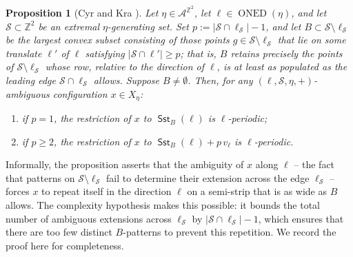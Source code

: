 \documentclass[12pt]{amsart}
\numberwithin{equation}{section}
\newtheorem{proposition}[theorem]{Proposition}
\DeclareMathOperator{\nexpd}{ONED}
\DeclareMathOperator{\sst}{\mathsf{Sst}}
\newcommand{\bb}[1]{\mathbb{#1}}
\begin{document}
\begin{proposition}[Cyr and Kra \cite{CyrKra15}]\label{prop_CyrKra}
Let $\eta \in \mathcal{A}^{\bb{Z}^2}$, let $\pmb{\ell} \in \nexpd(\eta)$,
and let $\mathcal{S} \subset \bb{Z}^2$ be an extremal $\eta$-generating
set. Set $p := |\mathcal{S} \cap \pmb{\ell}_{\mathcal{S}}|-1$, and let
$B \subset \mathcal{S} \setminus \pmb{\ell}_{\mathcal{S}}$ be the largest
convex subset consisting of those points $g \in \mathcal{S} \setminus
\pmb{\ell}_{\mathcal{S}}$ that lie on some translate $\pmb{\ell}'$ of
$\pmb{\ell}$ satisfying $|\mathcal{S} \cap \pmb{\ell}'| \geq p$; that
is, $B$ retains precisely the points of $\mathcal{S} \setminus
\pmb{\ell}_{\mathcal{S}}$ whose row, relative to the direction of
$\pmb{\ell}$, is at least as populated as the leading edge $\mathcal{S} \cap \pmb{\ell}_{\mathcal{S}}$
allows. Suppose $B \neq \emptyset$. Then, for any $(\pmb{\ell},\mathcal{S},
\eta,+)$-ambiguous configuration $x \in X_\eta$:
\begin{enumerate}[label=(\roman*)]\setlength{\itemsep}{5pt}
    \item if $p = 1$, the restriction of $x$ to $\sst_{B}(\pmb{\ell})$
    is $\ell$-periodic;
    \item if $p \geq 2$, the restriction of $x$ to
    $\sst_{B}(\pmb{\ell}) + p\,v_{\pmb{\ell}}$ is $\ell$-periodic.
\end{enumerate}
\end{proposition}

Informally, the proposition asserts that the ambiguity of $x$ along $\pmb{\ell}$ -- the fact that patterns on $\mathcal S \setminus \pmb{\ell}_{\mathcal S}$ fail to determine their extension across the edge $ \pmb{\ell}_{\mathcal S} $ -- forces $ x $ to repeat itself in the direction $ \pmb{\ell} $ on a semi-strip that is as wide as $B$ allows. The complexity hypothesis makes this possible: it bounds the total number of ambiguous extensions across $\pmb{\ell}_{\mathcal S}$ by $|\mathcal S \cap\pmb{\ell}_{\mathcal S }|-1$, which ensures that there are too few distinct $B$-patterns to prevent this repetition. We record the proof here for completeness. 
\end{document}
